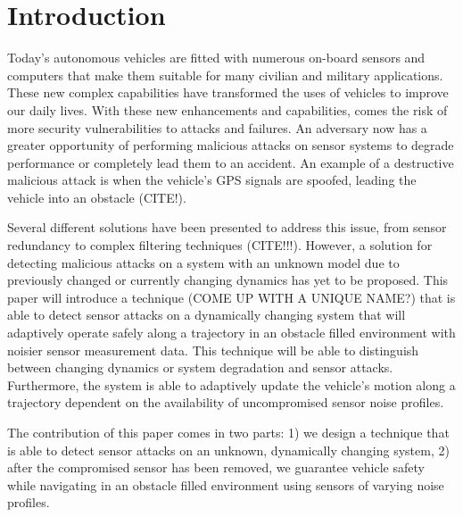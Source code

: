 
\section{Introduction} \label{sec:introduction}

Today's autonomous vehicles are fitted with numerous on-board sensors and computers that make them suitable for many civilian and military applications. These new complex capabilities have transformed the uses of vehicles to improve our daily lives. With these new enhancements and capabilities, comes the risk of more security vulnerabilities to attacks and failures. An adversary now has a greater opportunity of performing malicious attacks on sensor systems to degrade performance or completely lead them to an accident. An example of a destructive malicious attack is when the vehicle's GPS signals are spoofed, leading the vehicle into an obstacle (CITE!).

Several different solutions have been presented to address this issue, from sensor redundancy to complex filtering techniques (CITE!!!). However, a solution for detecting malicious attacks on a system with an unknown model due to previously changed or currently changing dynamics has yet to be proposed. This paper will introduce a technique (COME UP WITH A UNIQUE NAME?) that is able to detect sensor attacks on a dynamically changing system that will adaptively operate safely along a trajectory in an obstacle filled environment with noisier sensor measurement data. This technique will be able to distinguish between changing dynamics or system degradation and sensor attacks. Furthermore, the system is able to adaptively update the vehicle's motion along a trajectory dependent on the availability of uncompromised sensor noise profiles.

The contribution of this paper comes in two parts: 1) we design a technique that is able to detect sensor attacks on an unknown, dynamically changing system, 2) after the compromised sensor has been removed, we guarantee vehicle safety while navigating in an obstacle filled environment using sensors of varying noise profiles.





